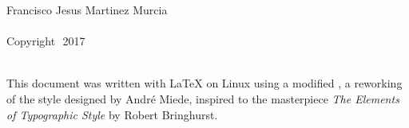 
\thispagestyle{empty}

\hfill


\begin{center}
Francisco Jesus Martinez Murcia\\
\smallskip
\textit{\myTitle}\\
\smallskip
Copyright\,\textcopyright\ 2017
\end{center}

\medskip

\noindent\textsf{} \\
\noindent
This document was written with \LaTeX{} on Linux using a modified \arsclassica, a reworking of the \classicthesis{} style designed by Andr\'e Miede, inspired to the masterpiece \emph{The Elements of Typographic Style} by Robert Bringhurst. 

\bigskip

\noindent
\textsf{}

\noindent
{}\,